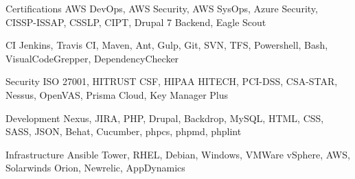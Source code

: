 


\begin{cvskills}


\cvskill
{Certifications}
{AWS DevOps, AWS Security, AWS SysOps, Azure Security, CISSP-ISSAP, CSSLP, CIPT, Drupal 7 Backend, Eagle Scout }

\cvskill
{CI}
{Jenkins, Travis CI, Maven, Ant, Gulp, Git, SVN, TFS, Powershell, Bash, VisualCodeGrepper, DependencyChecker }

\cvskill
{Security}
{ISO 27001, HITRUST CSF, HIPAA HITECH, PCI-DSS, CSA-STAR, Nessus, OpenVAS, Prisma Cloud, Key Manager Plus }

\cvskill
{Development}
{Nexus, JIRA, PHP, Drupal, Backdrop, MySQL, HTML, CSS, SASS, JSON, Behat, Cucumber, phpcs, phpmd, phplint }

\cvskill
{Infrastructure}
{Ansible Tower, RHEL, Debian, Windows, VMWare vSphere, AWS, Solarwinds Orion, Newrelic, AppDynamics }




\end{cvskills}
